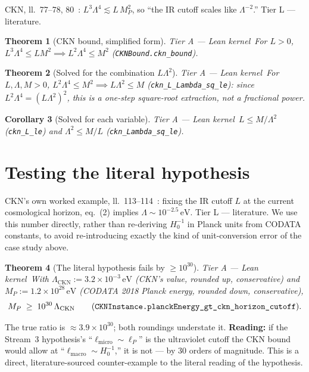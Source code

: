\documentclass[11pt,a4paper]{article}
\newtheorem{theorem}{Theorem}[section]
\newtheorem{corollary}[theorem]{Corollary}
\theoremstyle{remark}
\newcommand{\tierA}{\colorbox{green!15}{\textsf{\scriptsize Tier A --- Lean kernel}}}
\newcommand{\tierL}{\colorbox{blue!10}{\textsf{\scriptsize Tier L --- literature}}}
\begin{document}
CKN, ll.~77--78, 80~\cite{CKN1999}: $L^3\Lambda^4\lesssim L\,M_P^2$, so ``the IR cutoff scales
like $\Lambda^{-2}$.'' \tierL.

\begin{theorem}[CKN bound, simplified form] \label{thm:cknbound} \tierA\
For $L>0$, $L^3\Lambda^4\le LM^2\implies L^2\Lambda^4\le M^2$ \textnormal{(}\texttt{CKNBound.ckn\_bound}\textnormal{)}.
\end{theorem}

\begin{theorem}[Solved for the combination $L\Lambda^2$] \label{thm:cknla} \tierA\
For $L,\Lambda,M>0$, $L^2\Lambda^4\le M^2\implies L\Lambda^2\le M$
\textnormal{(}\texttt{ckn\_L\_Lambda\_sq\_le}\textnormal{)}: since $L^2\Lambda^4=(L\Lambda^2)^2$, this
is a one-step square-root extraction, not a fractional power.
\end{theorem}

\begin{corollary}[Solved for each variable] \label{cor:cknvars} \tierA\
$L\le M/\Lambda^2$ \textnormal{(}\texttt{ckn\_L\_le}\textnormal{)} and $\Lambda^2\le M/L$
\textnormal{(}\texttt{ckn\_Lambda\_sq\_le}\textnormal{)}.
\end{corollary}

\section{Testing the literal hypothesis}
\label{sec:falsify}
CKN's own worked example, ll.~113--114~\cite{CKN1999}: fixing the IR cutoff $L$ at the current
cosmological horizon, eq.~(2) implies $\Lambda\sim10^{-2.5}\,\mathrm{eV}$. \tierL. We use this
number directly, rather than re-deriving $H_0^{-1}$ in Planck units from CODATA constants, to
avoid re-introducing exactly the kind of unit-conversion error of the case study above.

\begin{theorem}[The literal hypothesis fails by $\ge10^{30}$] \label{thm:falsify} \tierA\
With $\Lambda_{\mathrm{CKN}}:=3.2\times10^{-3}\,\mathrm{eV}$ (CKN's value, rounded \emph{up},
conservative) and $M_P:=1.2\times10^{28}\,\mathrm{eV}$ (CODATA 2018 Planck energy, rounded
\emph{down}, conservative),
\[
M_P\;\ge\;10^{30}\,\Lambda_{\mathrm{CKN}} \qquad\textnormal{(\texttt{CKNInstance.planckEnergy\_gt\_ckn\_horizon\_cutoff})}.
\]
\end{theorem}
The true ratio is $\approx3.9\times10^{30}$; both roundings understate it. \textbf{Reading:} if the
Stream~3 hypothesis's ``$\ell_{\mathrm{micro}}\sim\ell_P$'' is the ultraviolet cutoff the CKN bound
would allow at ``$\ell_{\mathrm{macro}}\sim H_0^{-1}$,'' it is not --- by 30 orders of magnitude.
This is a direct, literature-sourced counter-example to the literal reading of the hypothesis.
\end{document}
